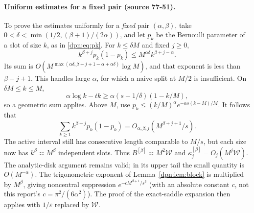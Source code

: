 \documentclass[11pt]{article}
\numberwithin{equation}{section}
\theoremstyle{definition}\newtheorem{definition}[theorem]{Definition}
\theoremstyle{remark}\newtheorem{remark}[theorem]{Remark}
\newcommand{\eps}{\varepsilon}
\newcommand{\src}[1]{\textup{(source #1)}}
\begin{document}
\paragraph{Uniform estimates for a fixed pair \src{77-51}.}
To prove the estimates uniformly for a \emph{fixed} pair $(\alpha,\beta)$, take
$0<\delta<\min(1/2,(\beta+1)/(2\alpha))$, and let $p_k$ be the Bernoulli
parameter of a slot of size $k$, as in \eqref{dpn:eq:pk}.  For $k\le\delta M$
and fixed $j\ge0$,
\[
 k^{\beta+j}p_k(1-p_k)\le M^{\alpha\delta}k^{\beta+j-\alpha}.
\]
Its sum is $O(M^{\max(\alpha\delta,\beta+j+1-\alpha+\alpha\delta)}\log M)$, and
that exponent is less than $\beta+j+1$.  This handles large $\alpha$, for
which a naive split at $M/2$ is insufficient.  On $\delta M\le k\le M$,
\[
 \alpha\log k-tk\ge\alpha(s-1/\delta)(1-k/M),
\]
so a geometric sum applies.  Above $M$, use
$p_k\le(k/M)^\alpha e^{-\alpha s(k-M)/M}$.  It follows that
\begin{equation}\label{dpn:fp:eq:familybounds}
 \sum_{k\ge1}k^{\beta+j}p_k(1-p_k)
 =O_{\alpha,\beta,j}(M^{\beta+j+1}/s).
\end{equation}
The active interval still has consecutive length comparable to $M/s$, but
each size now has $k^\beta\asymp M^\beta$ independent slots.  Thus
$B^{[\beta]}\asymp M^2\mathcal W$ and $\kappa^{[\beta]}_j=O_j(M^j\mathcal W)$.
The analytic-disk argument remains valid; in its upper tail the small quantity
is $O(M^{-\alpha})$.  The trigonometric exponent of Lemma~\ref{dpn:lem:block}
is multiplied by $M^\beta$, giving noncentral suppression
$e^{-cM^{\beta+1}/s^3}$ (with an absolute constant $c$, not this report's
$c=\pi^2/(6\alpha^2)$).  The proof of the exact-saddle expansion then applies
with $1/\eps$ replaced by $\mathcal W$.
\end{document}
